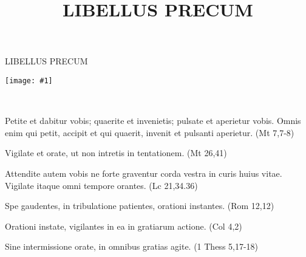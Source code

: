 \documentclass[12pt,a6paper]{book}
\title{LIBELLUS PRECUM}
\author{}
\date{}
\newcommand{\myimage}[2]{
\begin{center}
\texttt{[image: \#1]}
\end{center}}
\begin{document}
\vspace*{5mm}

\thispagestyle{empty}
\begin{center}
\Large{LIBELLUS PRECUM}
\end{center}

\myimage{op}{100pt}

\pagebreak

\thispagestyle{empty}

~

\pagebreak

\thispagestyle{empty}

\vspace*{-2mm}

\begin{textit}

Petite et dabitur vobis; quaerite et invenietis; pulsate et aperietur vobis. Omnis enim qui petit, accipit et qui quaerit, invenit et pulsanti aperietur. (Mt 7,7-8)

\vspace*{2mm}

Vigilate et orate, ut non intretis in tentationem. (Mt 26,41)

\vspace*{2mm}

Attendite autem vobis ne forte graventur corda vestra in curis huius vitae. Vigilate itaque omni tempore orantes. (Lc 21,34.36)

\vspace*{2mm}


Spe gaudentes, in tribulatione patientes, orationi instantes. (Rom 12,12)

\vspace*{2mm}






Orationi instate, vigilantes in ea in gratiarum actione. (Col 4,2)

\vspace*{2mm}

Sine intermissione orate, in omnibus gratias agite. (1 Thess 5,17-18)

\end{textit}
\end{document}
